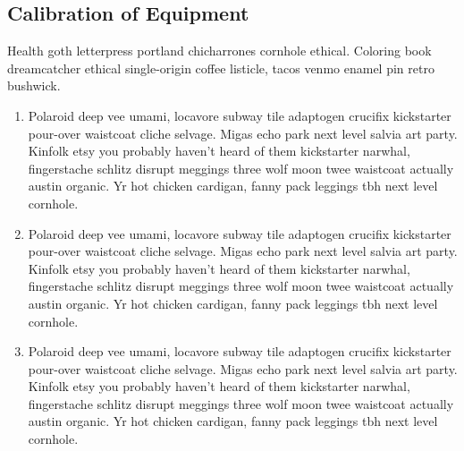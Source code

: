 \documentclass[titlepage,11pt]{article}
\begin{document}
\subsection*{Calibration of Equipment} 

Health goth letterpress portland chicharrones cornhole ethical. Coloring book dreamcatcher ethical single-origin coffee listicle, tacos venmo enamel pin retro bushwick. 

\begin{enumerate}

    \item Polaroid deep vee umami, locavore subway tile adaptogen crucifix kickstarter pour-over waistcoat cliche selvage. Migas echo park next level salvia art party. Kinfolk etsy you probably haven't heard of them kickstarter narwhal, fingerstache schlitz disrupt meggings three wolf moon twee waistcoat actually austin organic. Yr hot chicken cardigan, fanny pack leggings tbh next level cornhole.

    \item Polaroid deep vee umami, locavore subway tile adaptogen crucifix kickstarter pour-over waistcoat cliche selvage. Migas echo park next level salvia art party. Kinfolk etsy you probably haven't heard of them kickstarter narwhal, fingerstache schlitz disrupt meggings three wolf moon twee waistcoat actually austin organic. Yr hot chicken cardigan, fanny pack leggings tbh next level cornhole.

    \item Polaroid deep vee umami, locavore subway tile adaptogen crucifix kickstarter pour-over waistcoat cliche selvage. Migas echo park next level salvia art party. Kinfolk etsy you probably haven't heard of them kickstarter narwhal, fingerstache schlitz disrupt meggings three wolf moon twee waistcoat actually austin organic. Yr hot chicken cardigan, fanny pack leggings tbh next level cornhole.

\end{enumerate}
\end{document}
